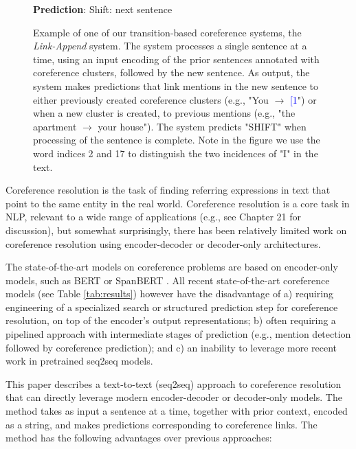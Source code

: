 \documentclass[11pt,a4paper]{article}
\newcommand{\LA}{Link-Append}
\begin{document}
\begin{figure}[ht!]
{\begin{tcolorbox}[colback=blue!1, outer arc=0mm, left=0mm,right=0mm,top=0mm,bottom=0mm]
{\bf Prediction}: {\sc Shift}: next sentence
\end{tcolorbox} 
}
 
\caption{ Example of one of our transition-based coreference systems, the {\em \LA} system. The system processes a single sentence at a time, using an input encoding of the prior sentences annotated with coreference clusters, followed by the new sentence. As output, the system makes predictions that link mentions in the new sentence to either previously created coreference clusters (e.g., "You $\rightarrow$ \textcolor{blue}{[1}") or when a new cluster is created, to previous mentions (e.g., "the apartment  $\rightarrow$ your house"). The system predicts "SHIFT" when processing of the sentence is complete. Note in the figure we use the word indices 2 and 17 to distinguish the two incidences of "I" in the text.
}
    \label{fig:example_introduction}
\end{figure}


Coreference resolution is the task of finding referring expressions in text that point to the same entity in the real world. Coreference resolution is a core task in NLP, relevant to a wide range of applications (e.g., see  Chapter 21 for discussion), but somewhat surprisingly, there has been relatively limited work on coreference resolution using encoder-decoder or decoder-only architectures. 

The state-of-the-art models on coreference problems are based on encoder-only models, such as BERT \cite{devlin-etal-2019-bert} or
SpanBERT \cite{joshi-etal-2020-spanbert}.
All recent state-of-the-art coreference models (see Table \ref{tab:results}) however have the disadvantage of
a) requiring engineering of a specialized search or structured prediction step for coreference resolution, on top of the encoder's output representations; b) often requiring a pipelined approach with intermediate stages of prediction (e.g., mention detection followed by coreference prediction); and c) an inability to leverage more recent work in pretrained seq2seq models.

This paper describes a text-to-text (seq2seq) approach to coreference resolution that can directly leverage modern encoder-decoder or decoder-only models. The method takes as input a sentence at a time, together with prior context, encoded as a string, and makes predictions corresponding to coreference links. The method has the following advantages over previous approaches: 
\end{document}

